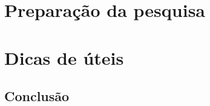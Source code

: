 \documentclass[
	12pt,				%
	openright,			%
	oneside,			%
	a4paper,			%
	french,				%
	spanish,			%
	english,			%
	brazil				%
	]{abntex2}
\begin{document}
\part{Preparação da pesquisa}






\part{Dicas de úteis}




\chapter*[Conclusão]{Conclusão}


\postextual


\end{document}

